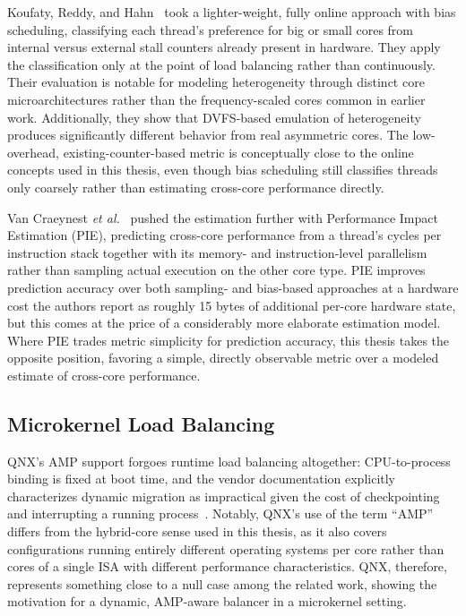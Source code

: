 Koufaty, Reddy, and Hahn~\cite{bias-scheduling} took a lighter-weight, fully online approach with bias scheduling, classifying each thread's preference for big or small cores from internal versus external stall counters already present in hardware.
They apply the classification only at the point of load balancing rather than continuously.
Their evaluation is notable for modeling heterogeneity through distinct core microarchitectures rather than the frequency-scaled cores common in earlier work.
Additionally, they show that DVFS-based emulation of heterogeneity produces significantly different behavior from real asymmetric cores.
The low-overhead, existing-counter-based metric is conceptually close to the online concepts used in this thesis, even though bias scheduling still classifies threads only coarsely rather than estimating cross-core performance directly.

Van Craeynest \textit{et al.}~\cite{pie} pushed the estimation further with Performance Impact Estimation (PIE), predicting cross-core performance from a thread's cycles per instruction stack together with its memory- and instruction-level parallelism rather than sampling actual execution on the other core type.
PIE improves prediction accuracy over both sampling- and bias-based approaches at a hardware cost the authors report as roughly 15 bytes of additional per-core hardware state, but this comes at the price of a considerably more elaborate estimation model.
Where PIE trades metric simplicity for prediction accuracy, this thesis takes the opposite position, favoring a simple, directly observable metric over a modeled estimate of cross-core performance.

\subsection{Microkernel Load Balancing}

QNX's AMP support forgoes runtime load balancing altogether: CPU-to-process binding is fixed at boot time, and the vendor documentation explicitly characterizes dynamic migration as impractical given the cost of checkpointing and interrupting a running process~\cite{qnx-amp}.
Notably, QNX's use of the term \enquote{AMP} differs from the hybrid-core sense used in this thesis, as it also covers configurations running entirely different operating systems per core rather than cores of a single ISA with different performance characteristics.
QNX, therefore, represents something close to a null case among the related work, showing the motivation for a dynamic, AMP-aware balancer in a microkernel setting.


